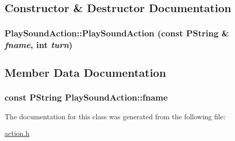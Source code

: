 \subsection{Constructor \& Destructor Documentation}
\hypertarget{classPlaySoundAction_52a859c9276e8b94fc49dab724791ef2}{
\subsubsection[{PlaySoundAction}]{\setlength{\rightskip}{0pt plus 5cm}PlaySoundAction::PlaySoundAction (const PString \& {\em fname}, \/  int {\em turn})}}
\label{classPlaySoundAction_52a859c9276e8b94fc49dab724791ef2}




\subsection{Member Data Documentation}
\hypertarget{classPlaySoundAction_a79fe8c0c31676fff2718ff9b5fe031c}{
\subsubsection[{fname}]{\setlength{\rightskip}{0pt plus 5cm}const PString {\bf PlaySoundAction::fname}}}
\label{classPlaySoundAction_a79fe8c0c31676fff2718ff9b5fe031c}




The documentation for this class was generated from the following file:\begin{CompactItemize}
\item 
\hyperlink{action_8h}{action.h}\end{CompactItemize}
